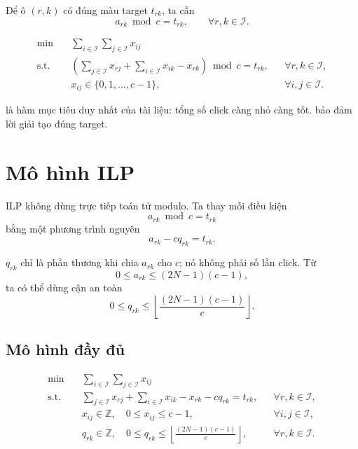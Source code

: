 \documentclass[11pt,a4paper]{article}
\newcommand{\Z}{\mathbb{Z}}
\newcommand{\I}{\mathcal{I}}
\begin{document}
Để ô $(r,k)$ có đúng màu target $t_{rk}$, ta cần
\begin{equation}\label{eq:mod-constraint}
  a_{rk}\bmod c=t_{rk},
  \qquad \forall r,k\in\I.
\end{equation}

\begin{summarybox}
\begin{align}
  \min\quad
  &\sum_{i\in\I}\sum_{j\in\I}x_{ij}
  \label{eq:objective}\\
  \text{s.t.}\quad
  &\left(
    \sum_{j\in\I}x_{rj}
    +\sum_{i\in\I}x_{ik}
    -x_{rk}
  \right)\bmod c=t_{rk},
  &&\forall r,k\in\I,
  \label{eq:model-mod}\\
  &x_{ij}\in\{0,1,\ldots,c-1\},
  &&\forall i,j\in\I.
  \label{eq:model-domain}
\end{align}
\end{summarybox}

 là hàm mục tiêu duy nhất của tài liệu: tổng số click
càng nhỏ càng tốt.  bảo đảm lời giải tạo đúng target.

\section{Mô hình ILP}\label{sec:ilp}

ILP không dùng trực tiếp toán tử modulo. Ta thay mỗi điều kiện
\[
  a_{rk}\bmod c=t_{rk}
\]
bằng một phương trình nguyên
\begin{equation}\label{eq:quotient}
  a_{rk}-c q_{rk}=t_{rk}.
\end{equation}

$q_{rk}$ chỉ là phần thương khi chia $a_{rk}$ cho $c$; nó không phải số
lần click. Từ
\[
  0\le a_{rk}\le(2N-1)(c-1),
\]
ta có thể dùng cận an toàn
\[
  0\le q_{rk}\le
  \left\lfloor\frac{(2N-1)(c-1)}{c}\right\rfloor.
\]

\subsection{Mô hình đầy đủ}
\begin{summarybox}
\begin{align}
  \min\quad
  &\sum_{i\in\I}\sum_{j\in\I}x_{ij}
  \label{eq:ilp-objective}\\
  \text{s.t.}\quad
  &\sum_{j\in\I}x_{rj}
   +\sum_{i\in\I}x_{ik}
   -x_{rk}
   -c q_{rk}
   =t_{rk},
   &&\forall r,k\in\I,
  \label{eq:ilp-effect}\\
  &x_{ij}\in\Z,\quad 0\le x_{ij}\le c-1,
   &&\forall i,j\in\I,
  \label{eq:ilp-x}\\
  &q_{rk}\in\Z,\quad
   0\le q_{rk}\le
   \left\lfloor\frac{(2N-1)(c-1)}{c}\right\rfloor,
   &&\forall r,k\in\I.
  \label{eq:ilp-q}
\end{align}
\end{summarybox}
\end{document}
